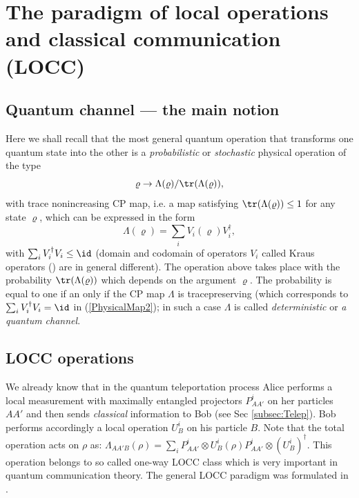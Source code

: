 \documentclass[rmp,12pt,preprint]{revtex4-2}
\begin{document}
\section{The paradigm of local operations and classical communication (LOCC)}
\label{sec:LOCC}


\subsection{Quantum channel --- the main notion}

Here we shall recall that the most general quantum operation that
transforms one quantum state into the other is a {\it probabilistic}
or {\it stochastic} physical operation of the type
\begin{equation}
\varrho \rightarrow \Lambda(\varrho)/{\tr}(\Lambda(\varrho)),
\label{PhysicalMap}
\end{equation}
with trace nonincreasing CP map, i.e. a map satisfying
${\tr}(\Lambda(\varrho))\leq 1$ for any state $\varrho$, which can be
expressed in the form
\begin{equation}
\Lambda(\varrho)=\sum_i V_{i}(\varrho)V_{i}^{\dagger},
\label{PhysicalMap2}
\end{equation}
with $\sum_{i}V_{i}^{\dagger}V_{i}\leq \id$ (domain and codomain of
operators $V_{i}$ called Kraus operators (\cite{KrausOperators}) are in general different). The operation above takes place
with the probability ${\tr}(\Lambda(\varrho))$ which depends on the
argument $\varrho$. The probability is equal to one if an only if
the CP map $\Lambda$ is tracepreserving (which corresponds to
$\sum_{i}V_{i}^{\dagger}V_{i}=\id$ in (\ref{PhysicalMap2}); in such a
case $\Lambda$ is called {\it deterministic} or {\it a quantum
channel}.

\subsection{LOCC operations}
\label{subsec:locc}

We already know that in the quantum teleportation process Alice
performs a local measurement with maximally entangled projectors
$P_{AA'}^{i}$ on her particles $AA'$ and then sends {\it classical}
information to Bob (see Sec \ref{subsec:Telep}). Bob performs accordingly a local operation
$U^{i}_{B}$ on his particle $B$. Note that the total operation acts on
$\rho$ as: $\Lambda_{AA'B}(\rho)=\sum_{i}P_{AA'}^{i} \otimes
U^{i}_{B}(\rho) P_{AA'}^{i} \otimes (U^{i}_{B})^{\dagger}$. This
operation belongs to so called one-way LOCC class which is very
important in quantum communication theory. The general LOCC paradigm
was formulated in \cite{BDSW1996}.
\end{document}
